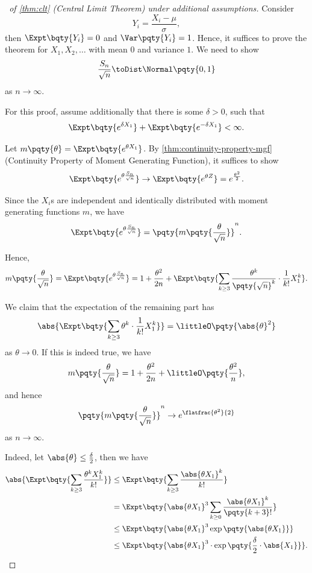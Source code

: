 \begin{proof}[\proofname\ of \autoref{thm:clt} (Central Limit Theorem) under additional assumptions]
    Consider
    \[
        Y_i = \frac{X_i - \mu}{\sigma},
    \]
    then \(\Expt\bqty{Y_i} = 0\) and \(\Var\pqty{Y_i} = 1\). Hence, it suffices to prove the theorem for \(X_1, X_2, \ldots\) with mean \(0\) and variance \(1\). We need to show
    \[
        \frac{S_n}{\sqrt{n}} \toDist \Normal\pqty{0, 1}
    \]
    as \(n \to \infty\).

    For this proof, assume additionally that there is some \(\delta > 0\), such that
    \[
        \Expt\bqty{e^{\delta X_1}} + \Expt\bqty{e^{- \delta X_1}} < \infty.
    \]

    Let \(m\pqty{\theta} = \Expt\bqty{e^{\theta X_1}}\). By \autoref{thm:continuity-property-mgf} (Continuity Property of Moment Generating Function), it suffices to show
    \[
        \Expt\bqty{e^{\theta \frac{S_n}{\sqrt{n}}}} \to \Expt\bqty{e^{\theta Z}} = e^{\frac{\theta^2}{2}}.
    \]

    Since the \(X_i\)s are independent and identically distributed with moment generating functions \(m\), we have
    \[
        \Expt\bqty{e^{\theta \frac{S_n}{\sqrt{n}}}} = \pqty{m\pqty{\frac{\theta}{\sqrt{n}}}}^{n}.
    \]

    Hence,
    \[
        m\pqty{\frac{\theta}{\sqrt{n}}} = \Expt\bqty{e^{\theta \frac{S_n}{\sqrt{n}}}} = 1 + \frac{\theta^2}{2n} + \Expt\bqty{\sum_{k \geq 3} \frac{\theta^k}{\pqty{\sqrt{n}}^k} \cdot \frac{1}{k!} X_1^k}.
    \]

    We claim that the expectation of the remaining part has
    \[
        \abs{\Expt\bqty{\sum_{k \geq 3} \theta^k \cdot \frac{1}{k!} X_1^k}} = \littleO\pqty{\abs{\theta}^2}
    \]
    as \(\theta \to 0\). If this is indeed true, we have
    \[
        m\pqty{\frac{\theta}{\sqrt{n}}} = 1 + \frac{\theta^2}{2n} + \littleO\pqty{\frac{\theta^2}{n}},
    \]
    and hence
    \[
        \pqty{m \pqty{\frac{\theta}{\sqrt{n}}}}^n \to e^{\flatfrac{\theta^2}{2}}
    \]
    as \(n \to \infty\).

    Indeed, let \(\abs{\theta} \leq \frac{\delta}{2}\), then we have
    \begin{align*}
        \abs{\Expt\bqty{\sum_{k \geq 3} \frac{\theta^k X_1^k}{k!}}} &\leq \Expt\bqty{\sum_{k \geq 3} \frac{\abs{\theta X_1}^k}{k!}} \\
        &= \Expt\bqty{\abs{\theta X_1}^3 \sum_{k \geq 0} \frac{\abs{\theta X_1}^k}{\pqty{k + 3}!}} \\
        &\leq \Expt\bqty{\abs{\theta X_1}^3 \exp\pqty{\abs{\theta X_1}}} \\
        &\leq \Expt\bqty{\abs{\theta X_1}^3 \cdot \exp\pqty{\frac{\delta}{2} \cdot \abs{X_1}}}.
    \end{align*}


\end{proof}
